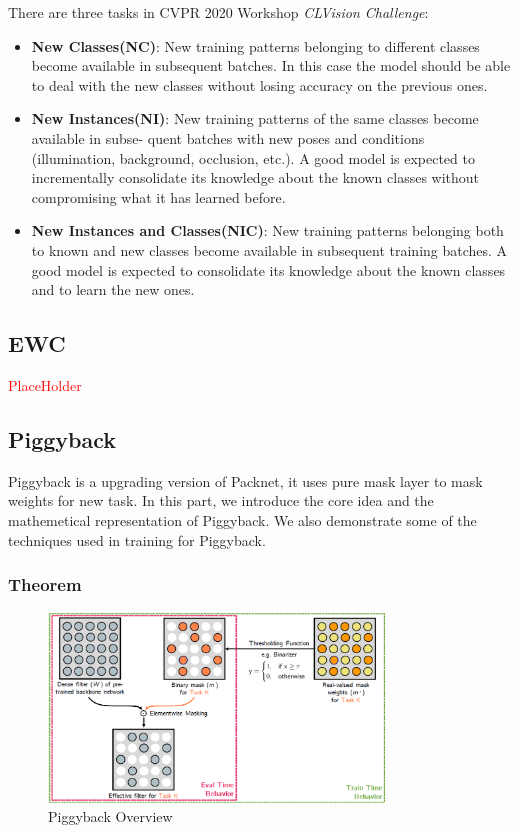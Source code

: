 There are three tasks in CVPR 2020 Workshop \textit{CLVision Challenge}:
\begin{itemize}
\item \textbf{New Classes(NC)}: New training patterns belonging to different classes become available in subsequent batches. In this case the model should be able to deal with the new classes without losing accuracy on the previous ones.
\item \textbf{New Instances(NI)}: New training patterns of the same classes become available in subse- quent batches with new poses and conditions (illumination, background, occlusion, etc.). A good model is expected to incrementally consolidate its knowledge about the known classes without compromising what it has learned before.
\item \textbf{New Instances and Classes(NIC)}: New training patterns belonging both to known and new classes become available in subsequent training batches. A good model is expected to consolidate its knowledge about the known classes and to learn the new ones.
\end{itemize} 

\subsection{EWC}
\textcolor{red}{PlaceHolder}


\subsection{Piggyback}
Piggyback is a upgrading version of Packnet, it uses pure mask layer to mask weights for new task. In this part, we introduce the core idea and the mathemetical representation of Piggyback. We also demonstrate some of the techniques used in training for Piggyback.

\subsubsection{Theorem}
\begin{figure}[h]
  \centering
  \includegraphics[width=0.8\textwidth]{figure/piggyback.png}
  \caption{Piggyback Overview}
  \label{piggy}
\end{figure}

